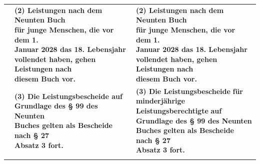 \documentclass[10pt,a4paper,landscape]{article}
\begin{document}
\begin{longtable}{|L{8.2cm}|L{8.2cm}|L{8.2cm}|}
\hhline{|---|}
 & \textbf{(2) Leistungen nach dem Neunten Buch  \newline für junge Menschen, die vor dem 1.  \newline Januar 2028 das 18. Lebensjahr  \newline vollendet haben, gehen Leistungen nach  \newline diesem Buch vor. } & \textbf{(2) Leistungen nach dem Neunten Buch  \newline für junge Menschen, die vor dem 1.  \newline Januar 2028 das 18. Lebensjahr  \newline vollendet haben, gehen Leistungen nach  \newline diesem Buch vor. } \\
\hhline{|---|}
 & \textbf{(3) Die Leistungsbescheide auf  \newline Grundlage des \S{} 99 des Neunten  \newline Buches gelten als Bescheide nach \S{} 27  \newline Absatz 3 fort. } & \textbf{(3) Die Leistungsbescheide }\textbf{\textcolor{diffgreen}{für  \newline minderjährige Leistungsberechtigte}}\textbf{ auf  \newline Grundlage des \S{} 99 des Neunten  \newline Buches gelten als Bescheide nach \S{} 27  \newline Absatz 3 fort. } \\
\hhline{|---|}

\end{longtable}
\end{document}

